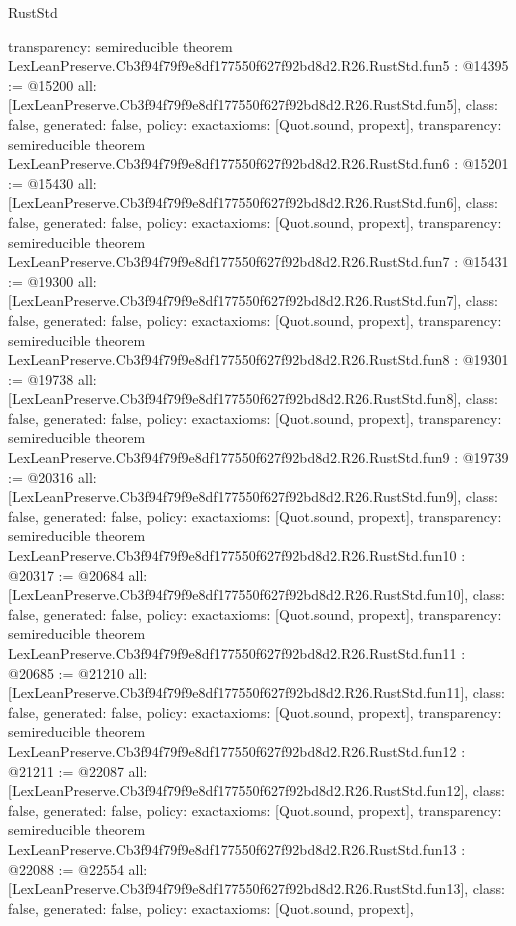 \begin{lexlean}{RustStd}
\begin{coremodule}
{  transparency: semireducible
}
theorem LexLeanPreserve.Cb3f94f79f9e8df177550f627f92bd8d2.R26.RustStd.fun5 : @14395 := @15200 {
  all: [LexLeanPreserve.Cb3f94f79f9e8df177550f627f92bd8d2.R26.RustStd.fun5],
  class: false,
  generated: false,
  policy: exact{axioms: [Quot.sound, propext]},
  transparency: semireducible
}
theorem LexLeanPreserve.Cb3f94f79f9e8df177550f627f92bd8d2.R26.RustStd.fun6 : @15201 := @15430 {
  all: [LexLeanPreserve.Cb3f94f79f9e8df177550f627f92bd8d2.R26.RustStd.fun6],
  class: false,
  generated: false,
  policy: exact{axioms: [Quot.sound, propext]},
  transparency: semireducible
}
theorem LexLeanPreserve.Cb3f94f79f9e8df177550f627f92bd8d2.R26.RustStd.fun7 : @15431 := @19300 {
  all: [LexLeanPreserve.Cb3f94f79f9e8df177550f627f92bd8d2.R26.RustStd.fun7],
  class: false,
  generated: false,
  policy: exact{axioms: [Quot.sound, propext]},
  transparency: semireducible
}
theorem LexLeanPreserve.Cb3f94f79f9e8df177550f627f92bd8d2.R26.RustStd.fun8 : @19301 := @19738 {
  all: [LexLeanPreserve.Cb3f94f79f9e8df177550f627f92bd8d2.R26.RustStd.fun8],
  class: false,
  generated: false,
  policy: exact{axioms: [Quot.sound, propext]},
  transparency: semireducible
}
theorem LexLeanPreserve.Cb3f94f79f9e8df177550f627f92bd8d2.R26.RustStd.fun9 : @19739 := @20316 {
  all: [LexLeanPreserve.Cb3f94f79f9e8df177550f627f92bd8d2.R26.RustStd.fun9],
  class: false,
  generated: false,
  policy: exact{axioms: [Quot.sound, propext]},
  transparency: semireducible
}
theorem LexLeanPreserve.Cb3f94f79f9e8df177550f627f92bd8d2.R26.RustStd.fun10 : @20317 := @20684 {
  all: [LexLeanPreserve.Cb3f94f79f9e8df177550f627f92bd8d2.R26.RustStd.fun10],
  class: false,
  generated: false,
  policy: exact{axioms: [Quot.sound, propext]},
  transparency: semireducible
}
theorem LexLeanPreserve.Cb3f94f79f9e8df177550f627f92bd8d2.R26.RustStd.fun11 : @20685 := @21210 {
  all: [LexLeanPreserve.Cb3f94f79f9e8df177550f627f92bd8d2.R26.RustStd.fun11],
  class: false,
  generated: false,
  policy: exact{axioms: [Quot.sound, propext]},
  transparency: semireducible
}
theorem LexLeanPreserve.Cb3f94f79f9e8df177550f627f92bd8d2.R26.RustStd.fun12 : @21211 := @22087 {
  all: [LexLeanPreserve.Cb3f94f79f9e8df177550f627f92bd8d2.R26.RustStd.fun12],
  class: false,
  generated: false,
  policy: exact{axioms: [Quot.sound, propext]},
  transparency: semireducible
}
theorem LexLeanPreserve.Cb3f94f79f9e8df177550f627f92bd8d2.R26.RustStd.fun13 : @22088 := @22554 {
  all: [LexLeanPreserve.Cb3f94f79f9e8df177550f627f92bd8d2.R26.RustStd.fun13],
  class: false,
  generated: false,
  policy: exact{axioms: [Quot.sound, propext]},
}
\end{coremodule}
\end{lexlean}
